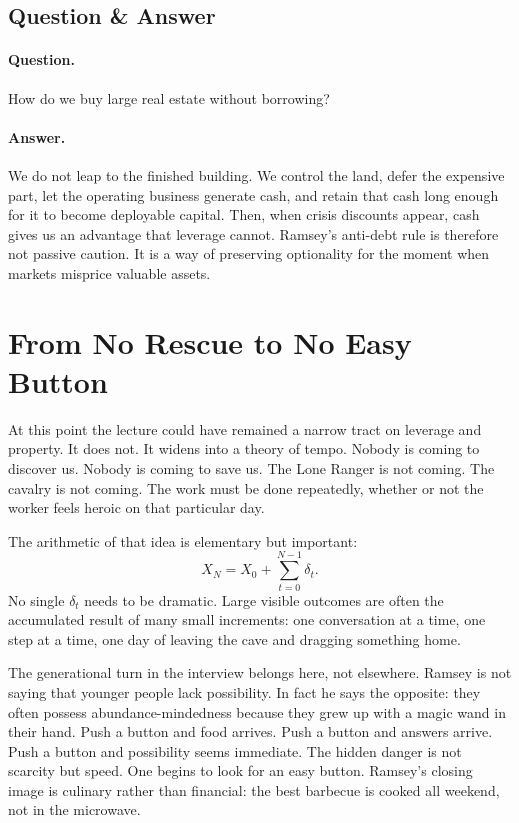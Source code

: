 \subsection{Question \& Answer}

\paragraph{Question.} How do we buy large real estate without borrowing?

\paragraph{Answer.} We do not leap to the finished building. We control the land, defer the expensive part, let the operating business generate cash, and retain that cash long enough for it to become deployable capital. Then, when crisis discounts appear, cash gives us an advantage that leverage cannot. Ramsey's anti-debt rule is therefore not passive caution. It is a way of preserving optionality for the moment when markets misprice valuable assets.

\section{From No Rescue to No Easy Button}

At this point the lecture could have remained a narrow tract on leverage and property. It does not. It widens into a theory of tempo. Nobody is coming to discover us. Nobody is coming to save us. The Lone Ranger is not coming. The cavalry is not coming. The work must be done repeatedly, whether or not the worker feels heroic on that particular day.

The arithmetic of that idea is elementary but important:
\begin{equation}
X_N = X_0 + \sum_{t=0}^{N-1}\delta_t.
\end{equation}
No single \(\delta_t\) needs to be dramatic. Large visible outcomes are often the accumulated result of many small increments: one conversation at a time, one step at a time, one day of leaving the cave and dragging something home.

The generational turn in the interview belongs here, not elsewhere. Ramsey is not saying that younger people lack possibility. In fact he says the opposite: they often possess abundance-mindedness because they grew up with a magic wand in their hand. Push a button and food arrives. Push a button and answers arrive. Push a button and possibility seems immediate. The hidden danger is not scarcity but speed. One begins to look for an easy button. Ramsey's closing image is culinary rather than financial: the best barbecue is cooked all weekend, not in the microwave.

